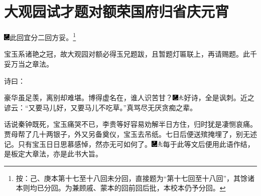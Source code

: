 
\chapter{大观园试才题对额\hspace{.5em}荣国府归省庆元宵}

{\includegraphics[width=3mm]{../Images/00003}\kaishu 此回宜分二回方妥。}\footnote{按：己、庚本第十七至十八回未分回，直接题为“第十七回至十八回”，其馀诸本则均已分回。为兼顾戚、蒙本的回前回后批，本校本仍予分回。}

{\kaishu 宝玉系诸艳之冠，故大观园对额必得玉兄题跋，且暂题灯匾联上，再请赐题。此千妥万当之章法。}

诗曰：

豪华虽足羡，离别却难堪。博得虚名在，谁人识苦甘？{\includegraphics[width=3mm]{../Images/00003}\includegraphics[width=3mm]{../Images/00012}\footnotesize \kaishu 好诗，全是讽刺。近之谚云：“又要马儿好，又要马儿不吃草。”真骂尽无厌贪痴之辈。}

话说秦钟既死，宝玉痛哭不已，李贵等好容易劝解半日方住，归时犹是凄恻哀痛。贾母帮了几十两银子，外又另备奠仪，宝玉去吊纸。七日后便送殡掩埋了，别无述记。只有宝玉日日思慕感悼，然亦无可如何了。{\includegraphics[width=3mm]{../Images/00003}\includegraphics[width=3mm]{../Images/00012}\footnotesize \kaishu 每于此等文后便用此语作结，是板定大章法，亦是此书大旨。}

